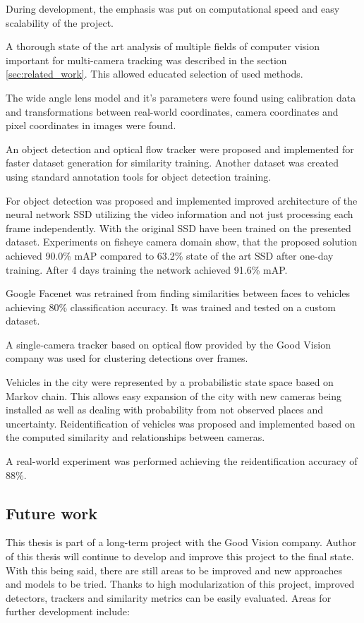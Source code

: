 \documentclass[a4paper,11pt,titlepage,twoside]{article}
\numberwithin{figure}{section}
\begin{document}
During development, the emphasis was put on computational speed and easy scalability of the project.

A thorough state of the art analysis of multiple fields of computer vision important for multi-camera tracking was described in the section \ref{sec:related_work}. This allowed educated selection of used methods.

The wide angle lens model and it's parameters were found using calibration data and transformations between real-world coordinates, camera coordinates and pixel coordinates in images were found.

An object detection and optical flow tracker were proposed and implemented for faster dataset generation for similarity training. Another dataset was created using standard annotation tools for object detection training.

For object detection was proposed and implemented improved architecture of the neural network SSD \cite{liu2016ssd} utilizing the video information and not just processing each frame independently. With the original SSD have been trained on the presented dataset. Experiments on fisheye camera domain show, that the proposed solution achieved 90.0\% mAP compared to 63.2\% state of the art SSD\cite{liu2016ssd} after one-day training. After 4 days training the network achieved 91.6\% mAP.

Google Facenet \cite{schroff2015facenet} was retrained from finding similarities between faces to vehicles achieving 80\% classification accuracy. It was trained and tested on a custom dataset.

A single-camera tracker based on optical flow provided by the Good Vision company was used for clustering detections over frames.

Vehicles in the city were represented by a probabilistic state space based on Markov chain. This allows easy expansion of the city with new cameras being installed as well as dealing with probability from not observed places and uncertainty. Reidentification of vehicles was proposed and implemented based on the computed similarity and relationships between cameras.

A real-world experiment was performed achieving the reidentification accuracy of 88\%.

\clearpage
\subsection{Future work}
This thesis is part of a long-term project with the Good Vision company. Author of this thesis will continue to develop and improve this project to the final state. With this being said, there are still areas to be improved and new approaches and models to be tried. Thanks to high modularization of this project, improved detectors, trackers and similarity metrics can be easily evaluated. Areas for further development include:
\end{document}
